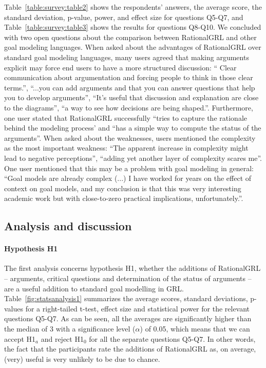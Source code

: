 Table~\ref{table:survey:table2} shows the respondents' answers, the average score, the standard deviation, p-value, power, and effect size for questions Q5-Q7, and Table~\ref{table:survey:table3} shows the results for questions Q8-Q10. We concluded with two open questions about the comparison between RationalGRL and other goal modeling languages. When asked about the advantages of RationalGRL over standard goal modeling languages, many users agreed that making arguments explicit may force end users to have a more structured discussion: ``	Clear communication about argumentation and forcing people to think in those clear terms.'', ``...you can add arguments and that you can answer questions that help you to develop arguments'', ``It's useful that discussion and explanation are close to the diagrams'', ``a way to see how decisions are being shaped.''. Furthermore, one user stated that RationalGRL successfully ``tries to capture the rationale behind the modeling process' and ``has a simple way to compute the status of the arguments''. When asked about the weaknesses, users mentioned the complexity as the most important weakness: ``The apparent increase in complexity might lead to negative perceptions'', ``adding yet another layer of complexity scares me''. One user mentioned that this may be a problem with goal modeling in general: ``Goal models are already complex (...) I have worked for years on the effect of context on goal models, and my conclusion is that this was very interesting academic work but with close-to-zero practical implications, unfortunately.''.

\subsection{Analysis and discussion}

\paragraph{Hypothesis H1}
The first analysis concerns hypothesis H1, whether the additions of RationalGRL -- arguments, critical questions and determination of the status of arguments -- are a useful addition to standard goal modelling in GRL. Table~\ref{fig:statsanalysis1} summarizes the average scores, standard deviations, p-values for a right-tailed t-test, effect size and statistical power for the relevant questions Q5-Q7. As can be seen, all the averages are significantly higher than the median of 3 with a significance level ($\alpha$) of 0.05, which means that we can accept H1$_{a}$ and reject H1$_{0}$ for all the separate questions Q5-Q7. In other words, the fact that the participants rate the additions of RationalGRL as, on average, (very) useful is very unlikely to be due to chance. 

